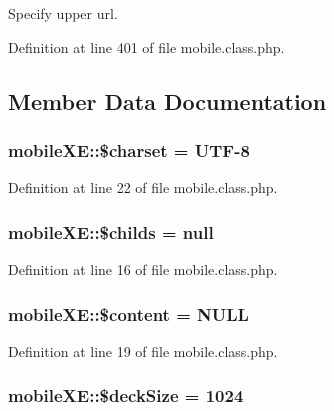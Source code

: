 Specify upper url. 



Definition at line 401 of file mobile.\+class.\+php.



\subsection{Member Data Documentation}
\subsubsection[{\texorpdfstring{\$charset}{$charset}}]{\setlength{\rightskip}{0pt plus 5cm}mobile\+X\+E\+::\$charset = \textquotesingle{}U\+TF-\/8\textquotesingle{}}\hypertarget{classmobileXE_ae49d948fe651953a56bac2a907f6057a}{}\label{classmobileXE_ae49d948fe651953a56bac2a907f6057a}


Definition at line 22 of file mobile.\+class.\+php.

\subsubsection[{\texorpdfstring{\$childs}{$childs}}]{\setlength{\rightskip}{0pt plus 5cm}mobile\+X\+E\+::\$childs = {\bf null}}\hypertarget{classmobileXE_ae641a3f98d4d95afe77f56456532aff7}{}\label{classmobileXE_ae641a3f98d4d95afe77f56456532aff7}


Definition at line 16 of file mobile.\+class.\+php.

\subsubsection[{\texorpdfstring{\$content}{$content}}]{\setlength{\rightskip}{0pt plus 5cm}mobile\+X\+E\+::\$content = N\+U\+LL}\hypertarget{classmobileXE_a827bc8119bac862a05a1c192125bf125}{}\label{classmobileXE_a827bc8119bac862a05a1c192125bf125}


Definition at line 19 of file mobile.\+class.\+php.

\subsubsection[{\texorpdfstring{\$deck\+Size}{$deckSize}}]{\setlength{\rightskip}{0pt plus 5cm}mobile\+X\+E\+::\$deck\+Size = 1024}\hypertarget{classmobileXE_a3d9450dc37a10f7bb11801ab29c000ed}{}\label{classmobileXE_a3d9450dc37a10f7bb11801ab29c000ed}


